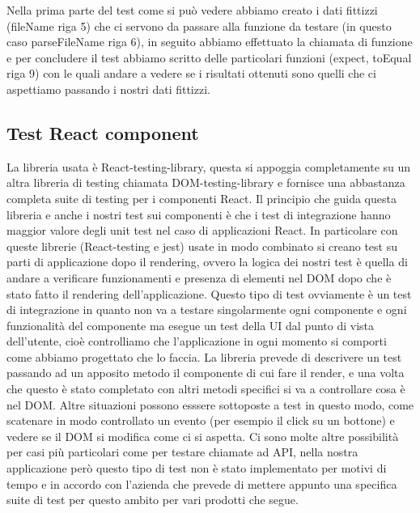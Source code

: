 Nella prima parte del test come si può vedere abbiamo creato i dati fittizzi (fileName riga 5) che ci servono da passare alla funzione da testare (in questo caso parseFileName riga 6), in seguito abbiamo effettuato la chiamata di funzione e
per concludere il test abbiamo scritto delle particolari funzioni (expect, toEqual riga 9) con le quali andare a vedere se i risultati ottenuti sono quelli che ci aspettiamo passando i nostri dati fittizzi.

\subsection{Test React component}
La libreria usata è React-testing-library, questa si appoggia completamente su un altra libreria di testing chiamata DOM-testing-library e fornisce una abbastanza completa suite di testing per i componenti React.
Il principio che guida questa libreria e anche i nostri test sui componenti è che i test di integrazione hanno maggior valore degli unit test nel caso di applicazioni React. In particolare con queste librerie (React-testing e jest) usate in modo combinato
si creano test su parti di applicazione dopo il rendering, ovvero la logica dei nostri test è quella di andare a verificare funzionamenti e presenza di elementi nel DOM dopo che è stato fatto il rendering
dell'applicazione. Questo tipo di test ovviamente è un test di integrazione in quanto non va a testare singolarmente ogni componente e ogni funzionalità del componente ma esegue un test della UI dal punto di vista dell'utente, cioè controlliamo che
l'applicazione in ogni momento si comporti come abbiamo progettato che lo faccia.
La libreria prevede di descrivere un test passando ad un apposito metodo il componente di cui fare il render, e una volta che questo è stato completato con altri metodi specifici si va a controllare cosa è nel DOM. Altre situazioni
possono esssere sottoposte a test in questo modo, come scatenare in modo controllato un evento (per esempio il click su un bottone) e vedere se il DOM si modifica come ci si aspetta. Ci sono molte altre possibilità per
casi più particolari come per testare chiamate ad API, nella nostra applicazione però questo tipo di test non è stato implementato per motivi di tempo e in accordo con l'azienda che prevede di mettere appunto
una specifica suite di test per questo ambito per vari prodotti che segue.

